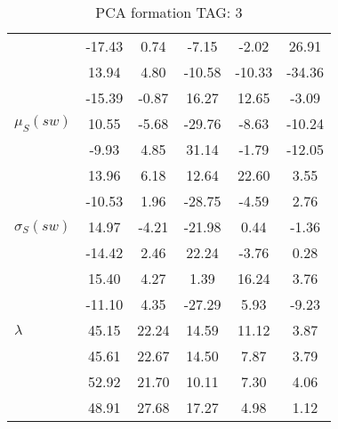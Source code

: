 \begin{table}[h!]
\begin{center}
\begin{tabular}{| l || c | c | c | c | c |}
 & -17.43  & 0.74  & -7.15  & -2.02  & 26.91 \\
 & 13.94  & 4.80  & -10.58  & -10.33  & -34.36 \\
 & -15.39  & -0.87  & 16.27  & 12.65  & -3.09 \\\hline
$\mu_S(sw)$ & 10.55  & -5.68  & -29.76  & -8.63  & -10.24 \\
 & -9.93  & 4.85  & 31.14  & -1.79  & -12.05 \\
 & 13.96  & 6.18  & 12.64  & 22.60  & 3.55 \\
 & -10.53  & 1.96  & -28.75  & -4.59  & 2.76 \\\hline
$\sigma_S(sw)$ & 14.97  & -4.21  & -21.98  & 0.44  & -1.36 \\
 & -14.42  & 2.46  & 22.24  & -3.76  & 0.28 \\
 & 15.40  & 4.27  & 1.39  & 16.24  & 3.76 \\
 & -11.10  & 4.35  & -27.29  & 5.93  & -9.23 \\\hline\hline
$\lambda$ & 45.15  & 22.24  & 14.59  & 11.12  & 3.87 \\
 & 45.61  & 22.67  & 14.50  & 7.87  & 3.79 \\
 & 52.92  & 21.70  & 10.11  & 7.30  & 4.06 \\
 & 48.91  & 27.68  & 17.27  & 4.98  & 1.12 \\\hline
\end{tabular}
\caption{PCA formation TAG: 3}
\end{center}
\end{table}
